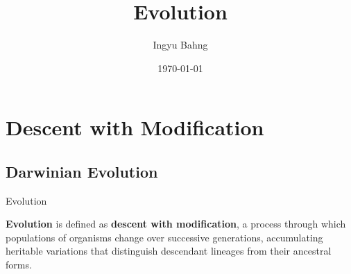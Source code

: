 \documentclass[10pt]{article}
\title{Evolution}
\date{\today}
\author{Ingyu Bahng}
\begin{document}


\section{Descent with Modification}

  \subsection{Darwinian Evolution}

    \begin{core}{Evolution}

      \textbf{Evolution} is defined as \textbf{descent with modification}, a process through which populations of organisms change over successive generations, accumulating heritable variations that distinguish descendant lineages from their ancestral forms.

    \end{core} 
\end{document}
